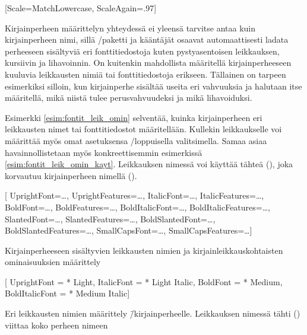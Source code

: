 \begin{koodilohkosis}
  \setmonofont{TeX Gyre Cursor}
  [Scale=MatchLowercase, ScaleAgain=.97]
\end{koodilohkosis}

Kirjainperheen määrittelyn yhteydessä ei yleensä tarvitse antaa kuin
kirjainperheen nimi, sillä \-/paketti ja kääntäjät
osaavat automaattisesti ladata perheeseen sisältyviä eri
fonttitiedostoja kuten pysty\-asen\-toi\-sen leikkauksen, kursiivin ja
lihavoinnin. On kuitenkin mahdollista määritellä kirjainperheeseen
kuuluvia leikkausten nimiä tai fonttitiedostoja erikseen. Tällainen on
tarpeen esimerkiksi silloin, kun kirjainperhe sisältää useita eri
vahvuuksia ja halutaan itse määritellä, mikä niistä tulee
perusvahvuudeksi ja mikä lihavoiduksi.

Esimerkki \ref{esim:fontit_leik_omin} selventää, kuinka kirjainperheen
eri leikkausten nimet tai fonttitiedostot määritellään. Kullekin
leikkaukselle voi määrittää myös omat asetuksensa
\-/loppuisella valitsimella. Samaa asiaa
havainnollistetaan myös konkreettisemmin esimerkissä
\ref{esim:fontit_leik_omin_kayt}. Leikkauksen nimessä voi käyttää tähteä
(\koodi{*}), joka korvautuu kirjainperheen nimellä ().

\begin{esimerkki*}
\begin{koodilohko}
  \setmainfont{…}[
    UprightFont={…},     UprightFeatures={…},
    ItalicFont={…},      ItalicFeatures={…},
    BoldFont={…},        BoldFeatures={…},
    BoldItalicFont={…},  BoldItalicFeatures={…},
    SlantedFont={…},     SlantedFeatures={…},
    BoldSlantedFont={…}, BoldSlantedFeatures={…},
    SmallCapsFont={…},   SmallCapsFeatures={…}]
\end{koodilohko}
\caption{Kirjainperheeseen sisältyvien leikkausten nimien ja
  kirjainleikkauskohtaisten ominaisuuksien määrittely}
\label{esim:fontit_leik_omin}
\end{esimerkki*}

\begin{esimerkki*}
\begin{koodilohko}
  \setmainfont{Macklin Text}[
    UprightFont    = {* Light},
    ItalicFont     = {* Light Italic},
    BoldFont       = {* Medium},
    BoldItalicFont = {* Medium Italic}]
\end{koodilohko}
\caption{Eri leikkausten nimien määrittely 
  \=/kirjainperheelle. Leikkauksen nimessä tähti (\koodi{*}) viittaa
  koko perheen nimeen}
\label{esim:fontit_leik_omin_kayt}
\end{esimerkki*}

